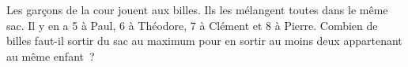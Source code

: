 \documentclass[exercice]{thedocument}%
\begin{document}
%
Les garçons de la cour jouent aux billes. Ils les mélangent toutes dans le même
sac. Il y en a 5 à Paul, 6 à Théodore, 7 à Clément et 8 à Pierre.\vskip5pt
Combien de billes faut-il sortir du sac au maximum pour en sortir au moins
deux appartenant au même enfant~?
\end{document}
